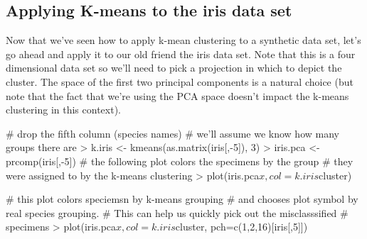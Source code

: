 \subsection{Applying K-means to the iris data set}

Now that we've seen how to apply k-mean clustering to a synthetic data set, let's go ahead and apply it to our old friend the iris data set. Note that this is a four dimensional data set so we'll need to pick a projection in which to depict the cluster.  The space of the first two principal components is a natural choice (but note that the fact that we're using the PCA space doesn't impact the k-means clustering in this context).

\begin{R}
# drop the fifth column (species names)
# we'll assume we know how many groups there are    
> k.iris <- kmeans(as.matrix(iris[,-5]), 3)    
> iris.pca <- prcomp(iris[,-5])
# the following plot colors the specimens by the group
# they were assigned to by the k-means clustering
> plot(iris.pca$x,col=k.iris$cluster)

# this plot colors speciemsn by k-means grouping
# and chooses plot symbol by real species grouping.
# This can help us quickly pick out the misclasssified
# specimens
> plot(iris.pca$x, col=k.iris$cluster, pch=c(1,2,16)[iris[,5]])
\end{R}









